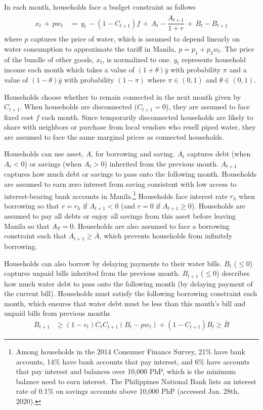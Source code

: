 \documentclass[12pt]{article}
\begin{document}
In each month, households face a budget constraint as follows
\begin{align}\label{eq:bc}
\begin{split}
x_t \, + \, p w_t \, &= \, y_t \, - (1-C_{t+1})f  \, + \,  A_t  - \dfrac{A_{t+1}}{1+r}   \, + \,  B_t - B_{t+1} 
\end{split}
\end{align}
where $p$ captures the price of water, which is assumed to depend linearly on water consumption to approximate the tariff in Manila, $p=p_1+p_2w_t$.   The price of the bundle of other goods, $x_t$, is normalized to one.  $y_t$ represents household income each month which takes a value of $(1+\theta)\bar{y}$ with probability $\pi$ and a value of $(1-\theta)\bar{y}$ with probability $(1-\pi)$ where $\pi \in (0,1)$ and $\theta  \in (0,1)$.  

Households choose whether to remain connected in the next month given by $C_{t+1}$.  When households are disconnected ($C_{t+1}=0$), they are assumed to face fixed cost $f$ each month.  Since temporarily disconnected households are likely to share with neighbors or purchase from local vendors who resell piped water, they are assumed to face the same marginal prices as connected households.

Households can use asset, $A$, for borrowing and saving.  $A_t$ captures debt (when $A_t<0$) or savings (when $A_t>0$) inherited from the previous month.  $A_{t+1}$ captures how much debt or savings to pass onto the following month.  Households are assumed to earn zero interest from saving consistent with low access to interest-bearing bank accounts in Manila.\footnote{Among households in the 2014 Consumer Finance Survey, 21\% have bank accounts, 14\% have bank accounts that pay interest, and 6\% have accounts that pay interest and balances over 10,000 PhP, which is the minimum balance need to earn interest.  The Philippines National Bank lists an interest rate of 0.1\% on savings accounts above 10,000 PhP (accessed Jan. 28th, 2020).} Households face interest rate $r_h$ when borrowing so that  $r=r_h$ if $A_{t+1}<0$ (and $r = 0$ if $A_{t+1}\geq 0$).  Households are assumed to pay all debts or enjoy all savings from this asset before leaving Manila so that $A_{T}=0$.  Households are also assumed to face a borrowing constraint such that $A_{t+1}\geq\overline{A}$, which prevents households from infinitely borrowing.

Households can also borrow by delaying payments to their water bills.  $B_t$ ($\leq0$) captures unpaid bills inherited from the previous month.  $B_{t+1}$ ($\leq0$) describes how much water debt to pass onto the following month (by delaying payment of the current bill).  Households must satisfy the following borrowing constraint each month, which ensures that water debt must be less than this month's bill and unpaid bills from previous months
\begin{align}\label{eq:borrowingconstraint}
B_{t+1} &\geq (1-v_t)  C_{t} C_{t+1} (B_t -pw_t) + (1-C_{t+1})B_t  \geq \overline{B}
\end{align}
\end{document}
